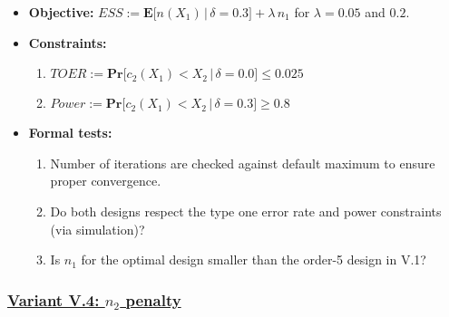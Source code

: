 \documentclass[]{book}
\providecommand{\tightlist}{%
  \setlength{\itemsep}{0pt}\setlength{\parskip}{0pt}}
\begin{document}
\begin{itemize}
\tightlist
\item
  \textbf{Objective:} \(ESS := \boldsymbol{E}\big[n(X_1)\,|\,\delta=0.3\big] + \lambda \, n_1\)
  for \(\lambda = 0.05\) and \(0.2\).
\item
  \textbf{Constraints:}

  \begin{enumerate}
  \def\labelenumi{\arabic{enumi}.}
  \tightlist
  \item
    \(TOER := \boldsymbol{Pr}\big[c_2(X_1) < X_2\,|\,\delta=0.0\big] \leq 0.025\)
  \item
    \(Power := \boldsymbol{Pr}\big[c_2(X_1) < X_2\,|\,\delta=0.3\big] \geq 0.8\)
  \end{enumerate}
\item
  \textbf{Formal tests:}

  \begin{enumerate}
  \def\labelenumi{\arabic{enumi}.}
  \tightlist
  \item
    Number of iterations are checked against default maximum to ensure proper
    convergence.
  \item
    Do both designs respect the type one error rate
    and power constraints (via simulation)?
  \item
    Is \(n_1\) for the optimal design smaller than the order-5 design in V.1?
  \end{enumerate}
\end{itemize}

\hypertarget{variant-v.4-n_2-penalty}{%
\subsubsection{\texorpdfstring{\protect\hyperlink{variantV_4}{Variant V.4: \(n_2\) penalty}}{Variant V.4: n\_2 penalty}}\label{variant-v.4-n_2-penalty}}
\end{document}

